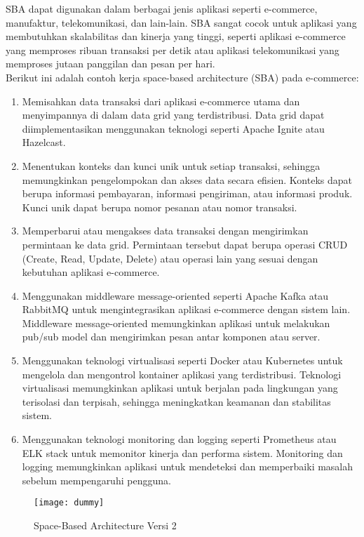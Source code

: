 	SBA dapat digunakan dalam berbagai jenis aplikasi seperti e-commerce, manufaktur, telekomunikasi, dan lain-lain. SBA sangat cocok untuk aplikasi yang membutuhkan skalabilitas dan kinerja yang tinggi, seperti aplikasi e-commerce yang memproses ribuan transaksi per detik atau aplikasi telekomunikasi yang memproses jutaan panggilan dan pesan per hari.\\
	
	Berikut ini adalah contoh kerja space-based architecture (SBA) pada e-commerce:
	\begin{enumerate}
		\item \large Memisahkan data transaksi dari aplikasi e-commerce utama dan menyimpannya di dalam data grid yang terdistribusi. Data grid dapat diimplementasikan menggunakan teknologi seperti Apache Ignite atau Hazelcast.
		\item \large Menentukan konteks dan kunci unik untuk setiap transaksi, sehingga memungkinkan pengelompokan dan akses data secara efisien. Konteks dapat berupa informasi pembayaran, informasi pengiriman, atau informasi produk. Kunci unik dapat berupa nomor pesanan atau nomor transaksi.
		\item \large Memperbarui atau mengakses data transaksi dengan mengirimkan permintaan ke data grid. Permintaan tersebut dapat berupa operasi CRUD (Create, Read, Update, Delete) atau operasi lain yang sesuai dengan kebutuhan aplikasi e-commerce.
		\item \large Menggunakan middleware message-oriented seperti Apache Kafka atau RabbitMQ untuk mengintegrasikan aplikasi e-commerce dengan sistem lain. Middleware message-oriented memungkinkan aplikasi untuk melakukan pub/sub model dan mengirimkan pesan antar komponen atau server.
		\item \large Menggunakan teknologi virtualisasi seperti Docker atau Kubernetes untuk mengelola dan mengontrol kontainer aplikasi yang terdistribusi. Teknologi virtualisasi memungkinkan aplikasi untuk berjalan pada lingkungan yang terisolasi dan terpisah, sehingga meningkatkan keamanan dan stabilitas sistem.
		\item \large Menggunakan teknologi monitoring dan logging seperti Prometheus atau ELK stack untuk memonitor kinerja dan performa sistem. Monitoring dan logging memungkinkan aplikasi untuk mendeteksi dan memperbaiki masalah sebelum mempengaruhi pengguna.
	\end{enumerate}
	\begin{figure}
		\centering
		\texttt{[image: dummy]}
		\caption{Space-Based Architecture Versi 2}
	\end{figure}
	\vskip0.5cm
